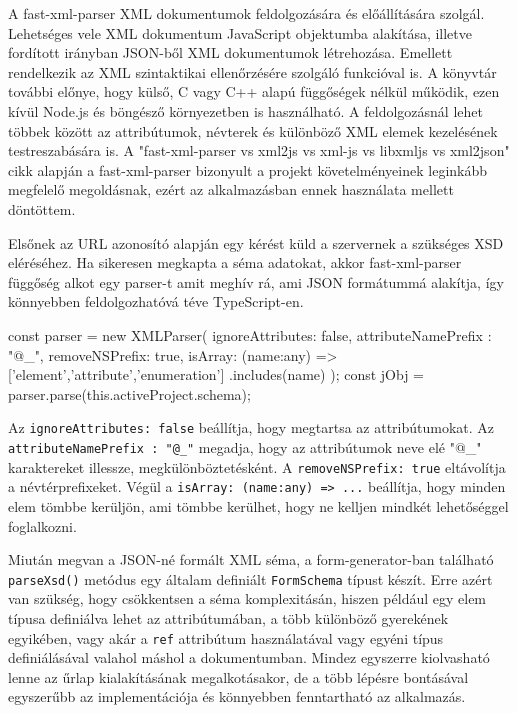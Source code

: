 A fast-xml-parser XML dokumentumok feldolgozására és előállítására szolgál. Lehetséges vele XML dokumentum JavaScript objektumba alakítása, illetve fordított irányban JSON-ből XML dokumentumok létrehozása. Emellett rendelkezik az XML szintaktikai ellenőrzésére szolgáló funkcióval is. A könyvtár további előnye, hogy külső, C vagy C++ alapú függőségek nélkül működik, ezen kívül Node.js és böngésző környezetben is használható. A feldolgozásnál lehet többek között az attribútumok, névterek és különböző XML elemek kezelésének testreszabására is. A "fast-xml-parser vs xml2js vs xml-js vs libxmljs vs xml2json" \cite{parserCompare} cikk alapján a fast-xml-parser bizonyult a projekt követelményeinek leginkább megfelelő megoldásnak, ezért az alkalmazásban ennek használata mellett döntöttem.

Elsőnek az URL azonosító alapján egy kérést küld a szervernek a szükséges XSD eléréséhez. Ha sikeresen megkapta a séma adatokat, akkor fast-xml-parser függőség alkot egy parser-t amit meghív rá, ami JSON formátummá alakítja, így könnyebben feldolgozhatóvá téve TypeScript-en.
\begin{java}
const parser = new XMLParser({
	ignoreAttributes: false,
	attributeNamePrefix : "@_",
	removeNSPrefix: true,
	isArray: (name:any) => 
	['element','attribute','enumeration']
	.includes(name)
});
const jObj = parser.parse(this.activeProject.schema);
\end{java}
Az \texttt{ignoreAttributes: false} beállítja, hogy megtartsa az attribútumokat. Az \\ \texttt{attributeNamePrefix : "@\_"} megadja, hogy az attribútumok neve elé "@\_" karaktereket illessze, megkülönböztetésként. A \texttt{removeNSPrefix: true} eltávolítja a névtérprefixeket. Végül a \texttt{isArray: (name:any) => ...} beállítja, hogy minden elem tömbbe kerüljön, ami tömbbe kerülhet, hogy ne kelljen mindkét lehetőséggel foglalkozni.

Miután megvan a JSON-né formált XML séma, a form-generator-ban található \texttt{parseXsd()} metódus egy általam definiált \texttt{FormSchema} típust készít. Erre azért van szükség, hogy csökkentsen a séma komplexitásán, hiszen például egy elem típusa definiálva lehet az attribútumában, a több különböző gyerekének egyikében, vagy akár a \texttt{ref} attribútum használatával vagy egyéni típus definiálásával valahol máshol a dokumentumban. Mindez egyszerre kiolvasható lenne az űrlap kialakításának megalkotásakor, de a több lépésre bontásával egyszerűbb az implementációja és könnyebben fenntartható az alkalmazás.

